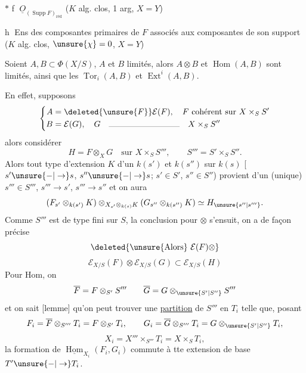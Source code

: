 $*$ \textcircled{f}   $\underline O_{(\operatorname{Supp}F)_{\text{réd}}}$ ($K$ alg. clos, 1 arg, $X=Y$)


\textcircled{h} Ens des   composantes primaires de $F$ associés aux composantes de son support ($K$ alg. clos, $\unsure{\chi}=0$, $X=Y$)

Soient $A,B\subset\Phi(X/S)$, $A$ et $B$ limités, alors $A\otimes B$ et $\operatorname{Hom}(A,B)$ sont limités, ainsi que les $\operatorname{Tor}_i(A,B)$ et $\operatorname{Ext}^i(A,B)$.

En effet, supposons
\[
\left\{\begin{aligned}
A&=\deleted{\unsure{F}}\mathcal E(F),\quad F\text{ cohérent sur }X\times_S S'\\
B&=\mathcal E(G),\quad G\quad\rule{3cm}{.2pt}\quad X\times_S S''
\end{aligned}\right.
\]
 alors considérer
\[
H=F\otimes_XG\quad\text{sur }X\times_S S''',\qquad S'''=S'\times_S S''.
\]
Alors tout type d'extension  $K$ d'un $k(s')$ et $k(s'')$ sur $k(s)$ [$s'\unsure{-|\to}s$, $s''\unsure{-|\to}s$; $s'\in S'$, $s''\in S''$) provient d'un (unique) $s'''\in S'''$, $s'''\to s'$, $s'''\to s''$ et on aura
\[
(F_{s'}\otimes_{k(s')}K)\otimes_{X_{s'}\otimes_{k(s)}K}(G_{s''}\otimes_{k(s'')}K)\simeq H_{\unsure{s''|s'''}}.
\]
Comme $S'''$ est de type fini sur $S$, la conclusion pour $\otimes$ s'ensuit, on a de façon précise
\[
\deleted{\text{\unsure{Alors}}\ \mathcal E(F)\otimes}
\]
\[
\mathcal E_{X/S}(F)\otimes\mathcal E_{X/S}(G)\subset\mathcal E_{X/S}(H)
\]
Pour Hom, on  
\[
\overline F=F\otimes_{S'}S'''\qquad\overline G=G\otimes_{\unsure{S'|S''}}S'''
\]
et on sait [lemme] qu'on peut trouver une \uline{partition} de $S'''$ en  $T_i$ telle que, posant
\[
F_i=\overline F\otimes_{S'''}T_i=F\otimes_{S'}T_i,\qquad G_i=\overline G\otimes_{S'''}T_i=G\otimes_{\unsure{S'|S''}}T_i,
\]
\[
X_i=X'''\times_{S'''}T_i=X\times_S T_i,
\]
la formation de $\underline{\operatorname{Hom}}_{X_i}(F_i,G_i)$ commute à tte extension de base $T'\unsure{-|\to}T_i$.

